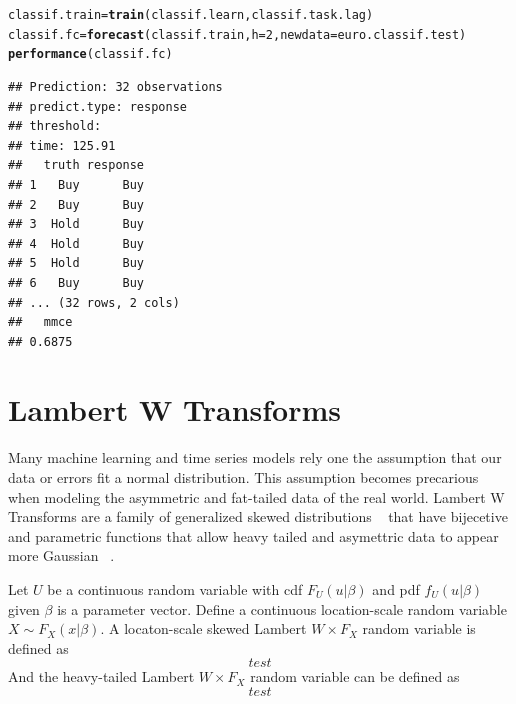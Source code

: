 \documentclass{article}\usepackage[]{graphicx}\usepackage[]{color}
\makeatletter
\newcommand{\hlnum}[1]{\textcolor[rgb]{0.686,0.059,0.569}{#1}}%
\newcommand{\hlstd}[1]{\textcolor[rgb]{0.345,0.345,0.345}{#1}}%
\newcommand{\hlkwb}[1]{\textcolor[rgb]{0.69,0.353,0.396}{#1}}%
\newcommand{\hlkwc}[1]{\textcolor[rgb]{0.333,0.667,0.333}{#1}}%
\newcommand{\hlkwd}[1]{\textcolor[rgb]{0.737,0.353,0.396}{\textbf{#1}}}%
\newenvironment{kframe}{%
 \def\at@end@of@kframe{}%
 \ifinner\ifhmode%
  \def\at@end@of@kframe{\end{minipage}}%
  \begin{minipage}{\columnwidth}%
 \fi\fi%
 \def\FrameCommand##1{\hskip\@totalleftmargin \hskip-\fboxsep
 \colorbox{shadecolor}{##1}\hskip-\fboxsep
     \hskip-\linewidth \hskip-\@totalleftmargin \hskip\columnwidth}%
 \MakeFramed {\advance\hsize-\width
   \@totalleftmargin\z@ \linewidth\hsize
   \@setminipage}}%
 {\par\unskip\endMakeFramed%
 \at@end@of@kframe}
\newenvironment{knitrout}{}{} %
\theoremstyle{definition}
\makeatother
\begin{document}
\begin{knitrout}
\color{fgcolor}\begin{kframe}
\begin{alltt}
\hlstd{classif.train} \hlkwb{=} \hlkwd{train}\hlstd{(classif.learn, classif.task.lag)}
\hlstd{classif.fc} \hlkwb{=} \hlkwd{forecast}\hlstd{(classif.train,} \hlkwc{h}\hlstd{=}\hlnum{2}\hlstd{,} \hlkwc{newdata} \hlstd{= euro.classif.test)}
\hlkwd{performance}\hlstd{(classif.fc)}
\end{alltt}
\end{kframe}
\end{knitrout}



\begin{knitrout}
\color{fgcolor}\begin{kframe}
\begin{verbatim}
## Prediction: 32 observations
## predict.type: response
## threshold: 
## time: 125.91
##   truth response
## 1   Buy      Buy
## 2   Buy      Buy
## 3  Hold      Buy
## 4  Hold      Buy
## 5  Hold      Buy
## 6   Buy      Buy
## ... (32 rows, 2 cols)
##   mmce 
## 0.6875
\end{verbatim}
\end{kframe}
\end{knitrout}

\section{Lambert W Transforms}

Many machine learning and time series models rely one the assumption that our data or errors fit a normal distribution. This assumption becomes precarious when modeling the asymmetric and fat-tailed data of the real world. Lambert W Transforms are a family of generalized skewed distributions ~\cite{LambertGeneral} that have bijecetive and parametric functions that allow heavy tailed and asymettric data to appear more Gaussian  ~\cite{GaussLam}. 

Let $U$ be a continuous random variable with cdf $F_U(u|\beta)$ and pdf $f_U(u|\beta)$ given $\beta$ is a parameter vector. Define a continuous location-scale random variable $X\sim F_X(x|\beta)$. A locaton-scale skewed Lambert $W\times F_X$ random variable is defined as 
\begin{equation}
test %
\end{equation}
And the heavy-tailed Lambert $W\times F_X$ random variable can be defined as
\begin{equation}
test %
\end{equation}
\end{document}
